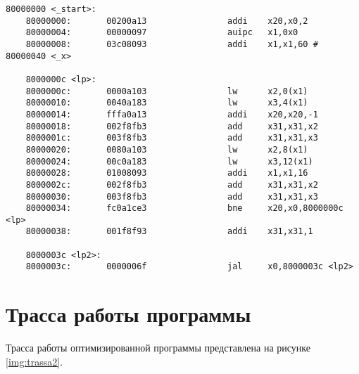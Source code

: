 \begin{lstlisting}[caption=Дизассемблерный листинг оптимизированной программы,
	label={list_disasm3}]
	80000000 <_start>:
	80000000:       00200a13                addi    x20,x0,2
	80000004:       00000097                auipc   x1,0x0
	80000008:       03c08093                addi    x1,x1,60 # 80000040 <_x>
	
	8000000c <lp>:
	8000000c:       0000a103                lw      x2,0(x1)
	80000010:       0040a183                lw      x3,4(x1)
	80000014:       fffa0a13                addi    x20,x20,-1
	80000018:       002f8fb3                add     x31,x31,x2
	8000001c:       003f8fb3                add     x31,x31,x3
	80000020:       0080a103                lw      x2,8(x1)
	80000024:       00c0a183                lw      x3,12(x1)
	80000028:       01008093                addi    x1,x1,16
	8000002c:       002f8fb3                add     x31,x31,x2
	80000030:       003f8fb3                add     x31,x31,x3
	80000034:       fc0a1ce3                bne     x20,x0,8000000c <lp>
	80000038:       001f8f93                addi    x31,x31,1
	
	8000003c <lp2>:
	8000003c:       0000006f                jal     x0,8000003c <lp2>
\end{lstlisting}

\section*{Трасса работы программы}

Трасса работы оптимизированной программы представлена на рисунке \ref{img:trassa2}.




\clearpage